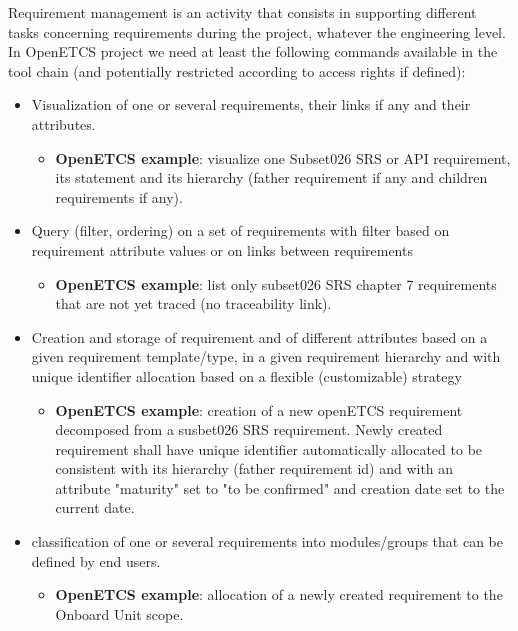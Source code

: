 \documentclass[11pt]{template/openetcs_report}
\begin{document}
Requirement management is an activity that consists in supporting different tasks concerning requirements during the project, whatever the engineering level. In OpenETCS project we need at least the following commands available in the tool chain (and potentially restricted according to access rights if defined):
\begin{itemize}

\item Visualization of one or several requirements, their links if any and their attributes. 
\begin{itemize} \item \textbf{OpenETCS example}: visualize one Subset026 SRS or API requirement, its statement and its hierarchy (father requirement if any and children requirements if any).\end{itemize}

\item Query (filter, ordering) on a set of requirements with filter based on requirement attribute values or on links between requirements
\begin{itemize} \item \textbf{OpenETCS example}: list only subset026 SRS chapter 7 requirements that are not yet traced (no traceability link).\end{itemize}

\item Creation and storage of requirement and of different attributes based on a given requirement template/type, in a given requirement hierarchy and with unique identifier allocation based on a flexible (customizable) strategy
\begin{itemize} \item \textbf{OpenETCS example}: creation of a new openETCS requirement decomposed from a susbet026 SRS requirement. Newly created requirement shall have unique identifier automatically allocated to be consistent with its hierarchy (father requirement id) and with an attribute "maturity" set to "to be confirmed" and creation date set to the current date.\end{itemize}

\item classification of one or several requirements into modules/groups that can be defined by end users.
\begin{itemize} \item \textbf{OpenETCS example}: allocation of a newly created requirement to the Onboard Unit scope.\end{itemize}


\end{itemize}
\end{document}
